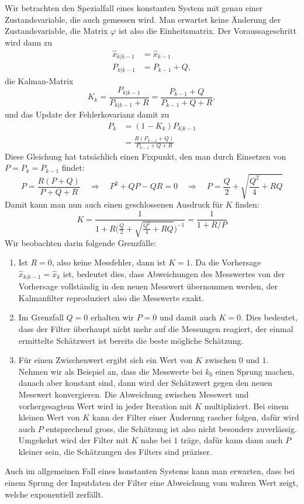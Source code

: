 Wir betrachten den Spezialfall eines konstanten System mit genau einer
Zustandsvariable,
die auch gemessen wird.
Man erwartet keine Änderung der Zustandsvariable,
die Matrix $\varphi$ ist also die Einheitsmatrix.
Der Voraussageschritt wird
dann zu 
\begin{align*}
\hat x_{k|k-1}&=\hat x_{k-1}\\
P_{k|k-1}&=P_{k-1}+Q,
\end{align*}
die Kalman-Matrix 
\[
K_{k}=\frac{P_{k|k-1}}{P_{k|k-1}+R}=\frac{P_{k-1}+Q}{P_{k-1}+Q+R},
\]
und das Update der Fehlerkovarianz damit zu
\begin{align*}
P_k&=(1-K_k)P_{k|k-1}\\
&=\frac{R(P_{k-1}+Q)}{P_{k-1}+Q+R}
\end{align*}
Diese Gleichung hat tatsächlich einen Fixpunkt, den man durch
Einsetzen von $P=P_k=P_{k-1}$ findet:
\[
P=\frac{R(P+Q)}{P+Q+R}
\quad\Rightarrow\quad
P^2+QP-QR=0
\quad\Rightarrow\quad
P=\frac{Q}2+\sqrt{\frac{Q^2}4+RQ}
\]
Damit kann man nun auch einen geschlossenen Ausdruck für $K$
finden:
\[
K=\frac{1}{1+R\biggl(\displaystyle\frac{Q}2+\sqrt{\frac{Q^2}4+RQ}\biggr)^{-1}}
=\frac1{1+R/P}
\]
Wir beobachten darin folgende Grenzfälle:
\begin{enumerate}
\item Ist $R=0$, also keine Messfehler, dann ist $K=1$.
Da die Vorhersage
$\hat x_{k|k-1}=\hat x_k$ ist, bedeutet dies, dass Abweichungen des Messwertes
von der Vorhersage vollständig in den neuen Messwert übernommen werden,
der Kalmanfilter reproduziert also die Messwerte exakt.
\item Im Grenzfall $Q=0$ erhalten wir $P=0$ und damit auch $K=0$.
Dies
bedeutet, dass der Filter überhaupt nicht mehr auf die Messungen reagiert,
der einmal ermittelte Schätzwert ist bereits die beste mögliche Schätzung.
\item Für einen Zwischenwert ergibt sich ein Wert von $K$ zwischen $0$ und $1$.
Nehmen wir als Beispiel an, dass die Messwerte bei $k_0$ einen Sprung machen,
danach aber konstant sind, dann wird der Schätzwert gegen den neuen Messwert
konvergieren.
Die Abweichung zwischen Messwert und vorhergesagtem Wert wird
in jeder Iteration mit $K$ multipliziert.
Bei einem kleinen Wert von $K$
kann der Filter einer Änderung rascher folgen, dafür wird auch $P$ entsprechend
gross, die Schätzung ist also nicht besonders zuverlässig.
Umgekehrt wird der Filter mit $K$ nahe bei $1$ träge, dafür kann dann auch
$P$ kleiner sein, die Schätzungen des Filters sind präziser.
\end{enumerate}
Auch im allgemeinen Fall eines konstanten Systems kann man erwarten,
dass bei einem Sprung der Inputdaten der Filter eine Abweichung vom
wahren Wert zeigt, welche exponentiell zerfällt.

